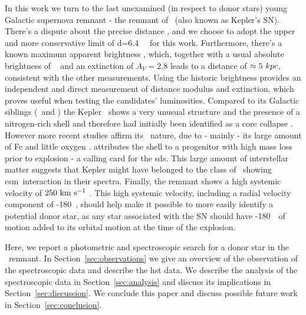 \documentclass[preprint2]{aastex}
\begin{document}
In this work we turn to the last unexamined (in respect to donor stars) young Galactic supernova remnant - the remnant of \ (also known as Kepler's SN). There's a dispute about the precise distance \citep[$4-6.4$\,\kpc; see][and references therein]{2012A&A...537A.139C}, and we choose to adopt the upper and more conservative limit of d=6.4~\kpc\ \citep{1999AJ....118..926R} for this work. Furthermore, there's a known maximum apparent brightness \citep[V=-3;][]{1971SvA....14..798P}, which, together with a usual absolute brightness of \sneia\  \citep[$M_V=-19.3$;][]{2011ApJ...732..129R} and an extinction of $A_V=2.8$ \citep{2007ApJ...668L.135R} leads to a distance of $\approx 5~kpc$, consistent with the other measurements. Using the historic brightness provides an independent and direct measurement of distance modulus and extinction, which proves useful when testing the candidates' luminosities. Compared to its Galactic siblings (\ and ) the Kepler \snr\ shows a very unusual structure and the presence of a nitrogen-rich shell and therefore had initially been identified as a core collapse \citep[e.g.][]{1987ApJ...319..885B}. However more recent studies affirm its \snia\ nature, due to - mainly - its large amount of Fe and little oxygen \citep{2007ApJ...668L.135R, 2012ApJ...756....6P}. \citet{2012A&A...537A.139C} attributes the shell to a progenitor with high mass loss prior to explosion - a calling card for the \gls{sds}. This large amount of interstellar matter suggests that Kepler might have belonged to the class of \sneia\ showing \gls{csm}\ interaction in their spectra. Finally, the remnant shows a high systemic velocity of  $250~\textrm{km}~\textrm{s}^{-1}$ \citep{1991ApJ...366..484B,2003A&A...407..249S}. This high systemic velocity, including a radial velocity component of -180~\kms, should help make it possible to more easily identify a potential donor star, as any star associated with the SN should have -180~\kms\ of motion added to its orbital motion at the time of the explosion.



Here, we report a photometric and spectroscopic search for a donor star in the \ remnant. In Section~\ref{sec:observations} we give an overview of the observation of the spectroscopic data and describe the \gls{hst} data. We describe the analysis of the spectroscopic data in Section~\ref{sec:analysis} and discuss its implications in Section~\ref{sec:discussion}. We conclude this paper and discuss possible future work in Section~\ref{sec:conclusion}.
\end{document}
